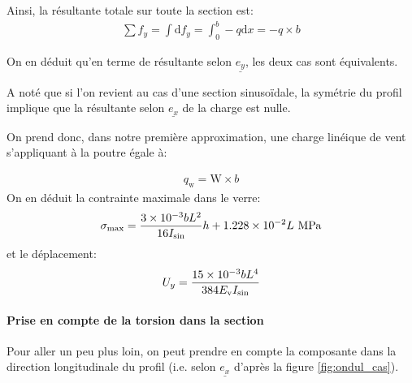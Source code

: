 \documentclass[11pt,titlepage]{article}
\begin{document}
Ainsi, la résultante totale sur toute la section est:
\begin{align}
    \sum f_y = \int \mathrm{d}f_y = \int_0^b -q \mathrm{d}x = -q\times b \label{eq:fy}
\end{align}


On en déduit qu'en terme de résultante selon $\underline{e_y}$, les deux cas sont équivalents.

A noté que si l'on revient au cas d'une section sinusoïdale, la symétrie du profil implique que la résultante selon $\underline{e_x}$ de la charge est nulle. 

On prend donc, dans notre première approximation, une charge linéique de vent s'appliquant à la poutre égale à:

\begin{align}
    q_{\text{w}} = \text{W} \times b
\end{align}
On en déduit la contrainte maximale dans le verre: 
\begin{align}
    \sigma_{\text{max}} = \frac{\num{3d-3} b L^2}{16 I_{\text{sin}}}h + \num{1.228d-2} L\text{ }\unit{\mega\pascal}
\end{align}
et le déplacement:
\begin{align}
    U_y = \frac{\num{15d-3} b L^4}{384 E_{\text{v}}I_{\text{sin}}}
\end{align}

\paragraph{Prise en compte de la torsion dans la section}\mbox{}

Pour aller un peu plus loin, on peut prendre en compte la composante dans la direction longitudinale du profil (i.e. selon $\underline{e_x}$ d'après la figure \ref{fig:ondul_cas}). 
\end{document}
